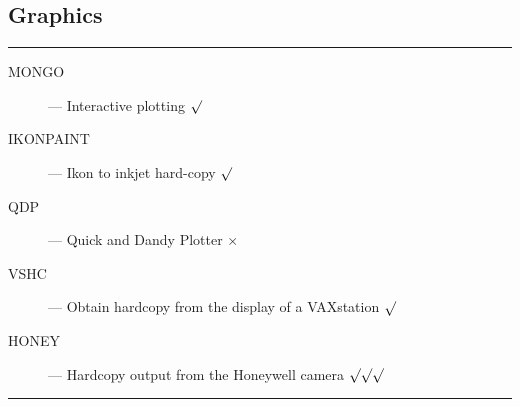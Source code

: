 \newpage

\subsection{Graphics}

\rule{\textwidth}{0.5mm}
\begin{description}
\begin{description}
\item [MONGO] --- Interactive plotting \hfill $\surd$
\item [IKONPAINT] --- Ikon to inkjet hard-copy \hfill $\surd$
\item [QDP] --- Quick and Dandy Plotter \hfill $\times$
\item [VSHC] --- Obtain hardcopy from the display of a VAXstation \hfill $\surd$
\item [HONEY] --- Hardcopy output from the Honeywell camera \hfill
 $\surd\surd\surd$
\end{description}
\end{description}
\rule{\textwidth}{0.5mm}

